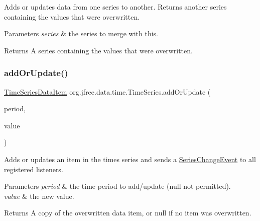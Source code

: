 Adds or updates data from one series to another. Returns another series containing the values that were overwritten.


\begin{DoxyParams}{Parameters}
{\em series} & the series to merge with this.\\
\hline
\end{DoxyParams}
\begin{DoxyReturn}{Returns}
A series containing the values that were overwritten. 
\end{DoxyReturn}
\mbox{\label{classorg_1_1jfree_1_1data_1_1time_1_1_time_series_a8db35a690b1aeb6aad87cefce17bdfee}} 
\subsubsection{\texorpdfstring{add\+Or\+Update()}{addOrUpdate()}\hspace{0.1cm}{\footnotesize\ttfamily [1/3]}}
{\footnotesize\ttfamily \mbox{\hyperlink{classorg_1_1jfree_1_1data_1_1time_1_1_time_series_data_item}{Time\+Series\+Data\+Item}} org.\+jfree.\+data.\+time.\+Time\+Series.\+add\+Or\+Update (\begin{DoxyParamCaption}\item[{\mbox{\hyperlink{classorg_1_1jfree_1_1data_1_1time_1_1_regular_time_period}{Regular\+Time\+Period}}}]{period,  }\item[{double}]{value }\end{DoxyParamCaption})}

Adds or updates an item in the times series and sends a \mbox{\hyperlink{}{Series\+Change\+Event}} to all registered listeners.


\begin{DoxyParams}{Parameters}
{\em period} & the time period to add/update ({\ttfamily null} not permitted). \\
\hline
{\em value} & the new value.\\
\hline
\end{DoxyParams}
\begin{DoxyReturn}{Returns}
A copy of the overwritten data item, or {\ttfamily null} if no item was overwritten. 
\end{DoxyReturn}
\mbox{\label{classorg_1_1jfree_1_1data_1_1time_1_1_time_series_a0e8779cd4e219e0908c68ceeb2f7c970}} 
